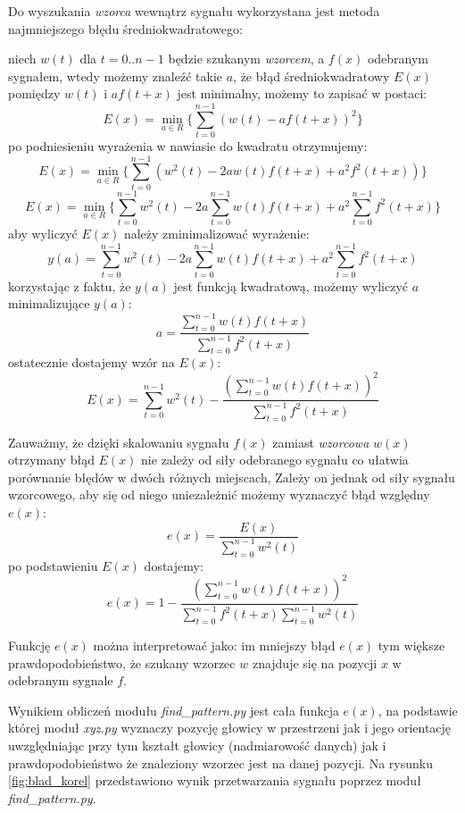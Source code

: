 Do wyszukania \textit{wzorca} wewnątrz sygnału wykorzystana jest metoda najmniejszego błędu średniokwadratowego:

niech $w(t)$  dla $t = 0..n-1$ będzie szukanym \textit{wzorcem}, a $f(x)$ odebranym sygnałem,
wtedy możemy znaleźć takie $a$, że błąd średniokwadratowy $E(x)$ pomiędzy $w(t)$ i $a f(t+x)$ jest minimalny,
możemy to zapisać w postaci:
\[
  E(x) = \min_{a \in R} \{ \sum_{t=0}^{n-1}  (w(t) - a f(t+x))^2 \}
\]
po podniesieniu wyrażenia w nawiasie do kwadratu otrzymujemy:
\[
  E(x) = \min_{a \in R} \{ \sum_{t=0}^{n-1}  (w^2(t) -2a w(t) f(t+x) + a^2 f^2(t+x)) \}
\]
\[
  E(x) = \min_{a \in R} \{ \sum_{t=0}^{n-1}  w^2(t) -2a \sum_{t=0}^{n-1}  w(t) f(t+x) + a^2 \sum_{t=0}^{n-1} f^2(t+x) \}
\]
aby wyliczyć $E(x)$ należy zminimalizować wyrażenie:
\[
  y(a) = \sum_{t=0}^{n-1}  w^2(t) -2a \sum_{t=0}^{n-1}  w(t) f(t+x) + a^2 \sum_{t=0}^{n-1} f^2(t+x)
\]
 korzystając z faktu, że $y(a)$ jest funkcją kwadratową, możemy wyliczyć $a$ minimalizujące $y(a)$:
\[
 a = \frac{ \sum\limits_{t=0}^{n-1}  w(t) f(t+x) }{ \sum\limits_{t=0}^{n-1} f^2(t+x) }
\]
ostatecznie dostajemy wzór na $E(x)$:
\[
  E(x) = \sum_{t=0}^{n-1}  w^2(t)  - \frac {(\sum\limits_{t=0}^{n-1}  w(t) f(t+x) )^2 } { \sum\limits_{t=0}^{n-1} f^2(t+x)}
\]

Zauważmy, że dzięki skalowaniu sygnału $f(x)$ zamiast \textit{wzorcowa} $w(x)$
otrzymany błąd $E(x)$ nie zależy od siły odebranego sygnału co ułatwia porównanie błędów w dwóch różnych miejscach,
Zależy on jednak od siły sygnału wzorcowego, aby się od niego uniezależnić możemy wyznaczyć
błąd względny $e(x)$:
\[
  e(x) = \frac{E(x)}{\sum\limits_{t=0}^{n-1}  w^2(t)}
\]
po podstawieniu $E(x)$ dostajemy:
\[
  e(x) = 1 - \frac {(\sum\limits_{t=0}^{n-1}  w(t) f(t+x) )^2 } { \sum\limits_{t=0}^{n-1} f^2(t+x) \sum\limits_{t=0}^{n-1}  w^2(t)}
\]
 
 Funkcję $e(x)$  można interpretować jako:
 im mniejszy błąd $e(x)$ tym większe prawdopodobieństwo, że szukany wzorzec $w$ znajduje się na pozycji $x$ w 
 odebranym sygnale $f$. 

 Wynikiem obliczeń modułu \textit{find\_pattern.py} jest cała funkcja $e(x)$, na podstawie której moduł \textit{xyz.py}
 wyznaczy pozycję głowicy w przestrzeni jak i jego orientację uwzględniając przy tym 
 kształt głowicy (nadmiarowość danych) jak i prawdopodobieństwo że znaleziony wzorzec jest na danej pozycji.
 Na rysunku \ref{fig:blad_korel} przedstawiono wynik przetwarzania sygnału poprzez moduł \textit{find\_pattern.py}.


